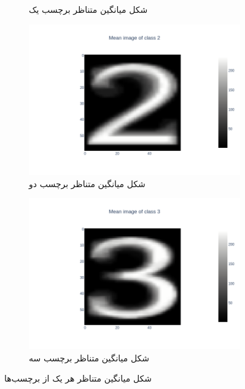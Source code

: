 \documentclass{article}
\begin{document}
\begin{figure}[h]
\begin{subfigure}{.48\linewidth}
        \caption{شکل میانگین متناظر برچسب یک}
    \end{subfigure}
    \newline
    \begin{subfigure}{.48\linewidth}
        \centering
        \includegraphics[width=\linewidth]{images/q2/partc/2_prototype.png}
        \caption{شکل میانگین متناظر برچسب دو}
    \end{subfigure}
    \hfill
    \begin{subfigure}{.48\linewidth}
        \centering
        \includegraphics[width=\linewidth]{images/q2/partc/3_prototype.png}
        \caption{شکل میانگین متناظر برچسب سه}
    \end{subfigure}
    \caption{شکل میانگین متناظر هر یک از برچسب‌ها}
    \label{q2-partc}
\end{figure}
\end{document}
